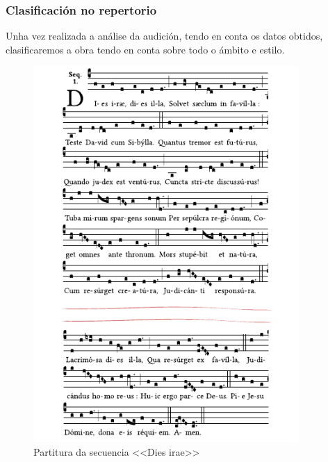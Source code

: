 \subsubsection*{Clasificación no repertorio} \label{Clasificación-dies-irae}
Unha vez realizada a análise da audición, tendo en conta os datos obtidos, clasificaremos a obra tendo en conta sobre todo o ámbito e estilo.
%
%
\vspace*{0.5cm}
\begin{ejercicio}

%

        \vspace*{2.78cm}
\end{ejercicio}

\begin{figure}[h]
    \centering
    \includegraphics[width=0.90\textwidth]{figures/ud-03/dies-irae-solesmes-cut.pdf}
    \caption{Partitura da secuencia <<Dies irae>>}
    \label{fig:dies-irae}
\end{figure}
%